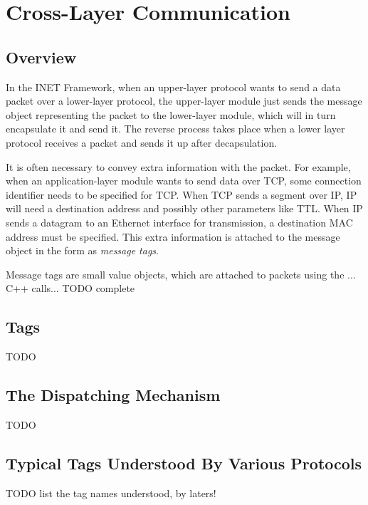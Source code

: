 \chapter{Cross-Layer Communication}
\label{cha:cross-layer-communication}

\section{Overview}

In the INET Framework, when an upper-layer protocol wants to send a data
packet over a lower-layer protocol, the upper-layer module just sends the
message object representing the packet to the lower-layer module, which
will in turn encapsulate it and send it. The reverse process takes place
when a lower layer protocol receives a packet and sends it up after
decapsulation.

It is often necessary to convey extra information with the packet. For
example, when an application-layer module wants to send data over TCP, some
connection identifier needs to be specified for TCP. When TCP sends a
segment over IP, IP will need a destination address and possibly other
parameters like TTL. When IP sends a datagram to an Ethernet interface for
transmission, a destination MAC address must be specified. This extra
information is attached to the message object in the form as \textit{message tags}.

Message tags are small value objects, which are attached to packets using 
the ... C++ calls...  TODO complete

 

\section{Tags}

TODO

\section{The Dispatching Mechanism}

TODO

\section{Typical Tags Understood By Various Protocols}

TODO list the tag names understood, by laters!




